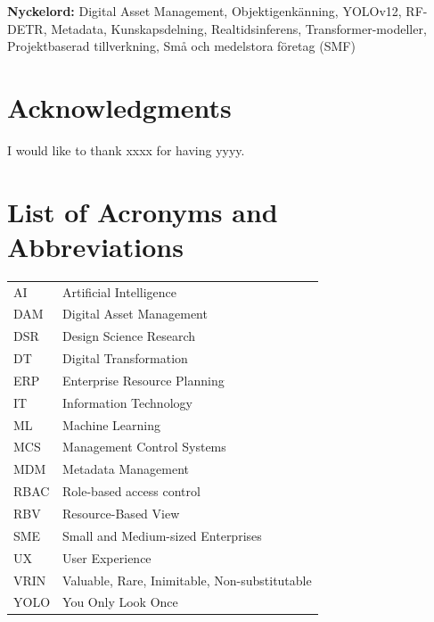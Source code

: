 \documentclass[a4paper,10pt,twocolumn]{article}
\numberwithin{figure}{section}
\numberwithin{table}{section}
\begin{document}
\vspace{0.3cm}
\textbf{Nyckelord:} 
Digital Asset Management, Objektigenkänning, YOLOv12, RF-DETR, Metadata, Kunskapsdelning, Realtidsinferens, Transformer-modeller, Projektbaserad tillverkning, Små och medelstora företag (SMF)

\newpage

\section*{Acknowledgments}
I would like to thank xxxx for having yyyy.

\newpage
{} 
\onecolumn
\tableofcontents
\newpage

\newpage
{} 
{}
\listoffigures
\newpage
{} 
{}
\listoftables

\newpage
{}
{}
\section*{List of Acronyms and Abbreviations}
\vspace{0.2cm} %

\renewcommand{\arraystretch}{1.2} %
\begin{flushleft} %
\begin{longtable}{p{5cm} p{12cm}} %
    
    AI   & Artificial Intelligence \\
    DAM  & Digital Asset Management \\
    DSR  & Design Science Research \\
    DT   & Digital Transformation \\
    ERP  & Enterprise Resource Planning \\
    IT   & Information Technology \\
    ML   & Machine Learning \\
    MCS  & Management Control Systems \\
    MDM  & Metadata Management \\
    RBAC & Role-based access control \\
    RBV  & Resource-Based View \\
    SME  & Small and Medium-sized Enterprises \\
    UX   & User Experience \\
    VRIN & Valuable, Rare, Inimitable, Non-substitutable \\
    YOLO & You Only Look Once \\
    
\end{longtable}
\end{flushleft}
\end{document}
